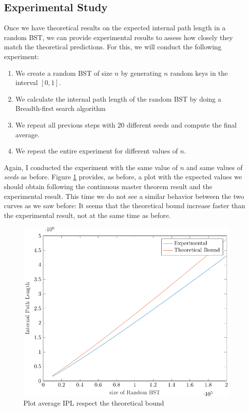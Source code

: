\subsection{Experimental Study}
Once we have theoretical results on the expected internal path length in a random BST, we can provide experimental results to assess how closely they match the theoretical predictions. For this, we will conduct the following experiment:

\begin{enumerate}
    \item We create a random BST of size \( n \) by generating \( n \) random keys in the interval \( [0,1] \).
    \item We calculate the internal path length of the random BST by doing a Breadth-first search algorithm
    \item We repeat all previous steps with 20 different seeds and compute the final average.
    \item We repeat the entire experiment for different values of \( n \).
\end{enumerate}

Again, I conducted the experiment with the same value of $n$ and same values of \textit{seeds} as before. Figure \ref{fig:plotBoundIPL} provides, as before, a plot with the expected values we should obtain following the continuous master theorem result and the experimental result. This time we do not see a similar behavior between the two curves as we saw before: It seems that the theoretical bound increase faster than the experimental result, not at the same time as before.

\begin{figure}
    \centering
    \includegraphics[scale=0.65]{plotIPL.pdf}
    \caption{Plot average IPL respect the theoretical bound}
    \label{fig:plotBoundIPL}
\end{figure}


